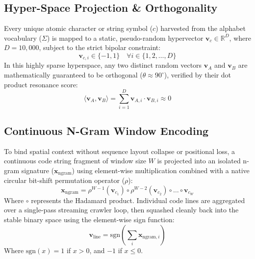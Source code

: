 \documentclass[twocolumn,10pt,journal]{article}
\begin{document}
\subsection{Hyper-Space Projection \& Orthogonality}
Every unique atomic character or string symbol ($c$) harvested from the alphabet vocabulary ($\Sigma$) is mapped to a static, pseudo-random hypervector $\mathbf{v}_c \in \mathbb{R}^D$, where $D = 10,000$, subject to the strict bipolar constraint:
\begin{equation}
\mathbf{v}_{c,i} \in \{-1, 1\} \quad \forall i \in \{1, 2, \dots, D\}
\end{equation}
In this highly sparse hyperspace, any two distinct random vectors $\mathbf{v}_A$ and $\mathbf{v}_B$ are mathematically guaranteed to be orthogonal ($\theta \approx 90^\circ$), verified by their dot product resonance score:
\begin{equation}
\langle \mathbf{v}_A, \mathbf{v}_B \rangle = \sum_{i=1}^{D} \mathbf{v}_{A,i} \cdot \mathbf{v}_{B,i} \approx 0
\end{equation}

\subsection{Continuous N-Gram Window Encoding}
To bind spatial context without sequence layout collapse or positional loss, a continuous code string fragment of window size $W$ is projected into an isolated n-gram signature ($\mathbf{x}_{\text{ngram}}$) using element-wise multiplication combined with a native circular bit-shift permutation operator ($\rho$):
\begin{equation}
\mathbf{x}_{\text{ngram}} = \rho^{W-1}(\mathbf{v}_{c_1}) \circ \rho^{W-2}(\mathbf{v}_{c_2}) \circ \dots \circ \mathbf{v}_{c_W}
\end{equation}
Where $\circ$ represents the Hadamard product. Individual code lines are aggregated over a single-pass streaming crawler loop, then squashed cleanly back into the stable binary space using the element-wise sign function:
\begin{equation}
\mathbf{v}_{\text{line}} = \text{sgn}\left( \sum_{i} \mathbf{x}_{\text{ngram}, i} \right)
\end{equation}
Where $\text{sgn}(x) = 1$ if $x > 0$, and $-1$ if $x \leq 0$.
\end{document}
